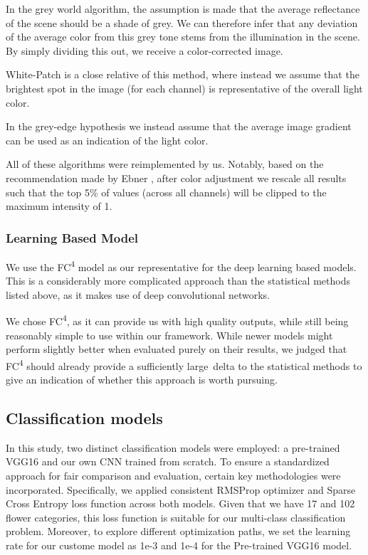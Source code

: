 In the grey world algorithm, the assumption is made that the average reflectance of the scene should
be a shade of grey. We can therefore infer that any deviation of the average color from this grey tone stems from
the illumination in the scene. By simply dividing this out, we receive a color-corrected image.

White-Patch is a close relative of this method, where instead we assume that the brightest spot in the image (for each channel)
is representative of the overall light color.

In the grey-edge hypothesis we instead assume that the average image gradient can be used as an indication of the light color.

All of these algorithms were reimplemented by us. Notably, based on the recommendation made by Ebner \cite{EbnerConstancy},
after color adjustment we rescale all results such that the top 5\% of values (across all channels) will be clipped to
the maximum intensity of 1.

\subsubsection{Learning Based Model}

We use the FC\textsuperscript{4} model\cite{hu2017fc} as our representative for the deep learning based models. This is a considerably more complicated approach
than the statistical methods listed above, as it makes use of deep convolutional networks.

We chose FC\textsuperscript{4}, as it can provide us with high quality outputs, while still being reasonably simple to use within our framework. While newer
models might perform slightly better when evaluated purely on their results, we judged that FC\textsuperscript{4} should already provide a sufficiently large\
delta to the statistical methods to give an indication of whether this approach is worth pursuing.

\subsection{Classification models}

In this study, two distinct classification models were employed: a pre-trained VGG16 and our own \gls{CNN} trained from scratch.
To ensure a standardized approach for fair comparison and evaluation, certain key methodologies were incorporated.
Specifically, we applied consistent RMSProp optimizer and Sparse Cross Entropy loss function across both models.
Given that we have 17 and 102 flower categories, this loss function is suitable for our multi-class classification problem. Moreover, to explore different optimization paths, we set the learning rate
for our custome model as 1e-3 and 1e-4 for the Pre-trained VGG16 model.

